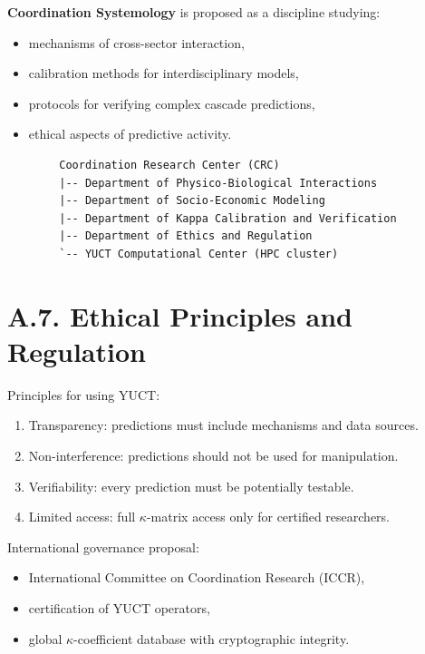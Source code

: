 \documentclass[13pt,a4paper]{article}
\begin{document}
	\textbf{Coordination Systemology} is proposed as a discipline studying:
	\begin{itemize}[leftmargin=*]
		\item mechanisms of cross-sector interaction,
		\item calibration methods for interdisciplinary models,
		\item protocols for verifying complex cascade predictions,
		\item ethical aspects of predictive activity.
	\end{itemize}
	
	\begin{lstlisting}
		Coordination Research Center (CRC)
		|-- Department of Physico-Biological Interactions
		|-- Department of Socio-Economic Modeling
		|-- Department of Kappa Calibration and Verification
		|-- Department of Ethics and Regulation
		`-- YUCT Computational Center (HPC cluster)
	\end{lstlisting}
	
	\section*{A.7. Ethical Principles and Regulation}
	
	Principles for using YUCT:
	\begin{enumerate}[leftmargin=*]
		\item Transparency: predictions must include mechanisms and data sources.
		\item Non-interference: predictions should not be used for manipulation.
		\item Verifiability: every prediction must be potentially testable.
		\item Limited access: full $\kappa$-matrix access only for certified researchers.
	\end{enumerate}
	
	International governance proposal:
	\begin{itemize}[leftmargin=*]
		\item International Committee on Coordination Research (ICCR),
		\item certification of YUCT operators,
		\item global $\kappa$-coefficient database with cryptographic integrity.
	\end{itemize}
	
\end{document}

